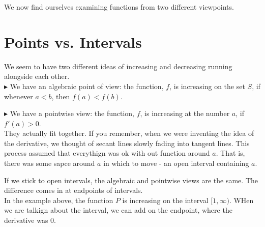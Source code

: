 \documentclass{ximera}
\begin{document}
We now find ourselves examining functions from two different viewpoints. \\



\section{ Points vs. Intervals}




We seem to have two different ideas of increasing and decreasing running alongside each other. \\



$\blacktriangleright$ We have an algebraic point of view: the function, $f$, is increasing on the set $S$, if whenever $a < b$, then $f(a) < f(b)$.



$\blacktriangleright$ We have a pointwise view: the function, $f$, is increasing at the number $a$, if $f'(a) > 0$. \\



They actually fit together. If you remember, when we were inventing the idea of the derivative, we thought of secant lines slowly fading into tangent lines.  This process assumed that everythign was ok with out function around $a$.  That is, there was some sapce around $a$ in which to move - an open interval containing $a$.

If we stick to open intervals, the algebraic and pointwise views are the same.  The difference comes in at endpoints of intervals. \\


In the example above, the function $P$ is increasing on the interval $[1, \infty)$.  WHen we are talkign about the interval, we can add on the endpoint, where the derivative was $0$.
\end{document}
